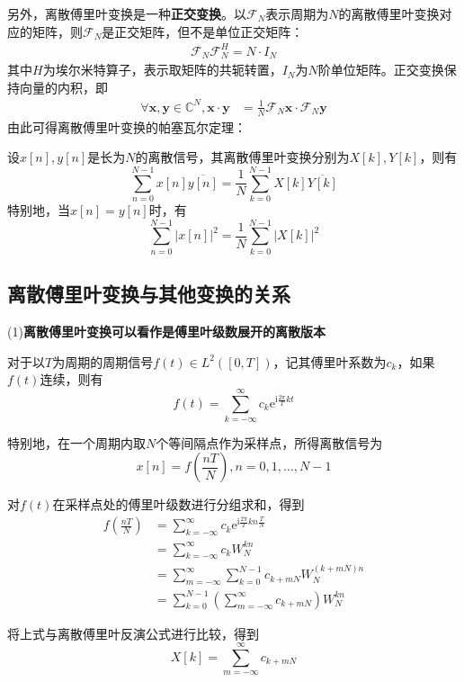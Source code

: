 \documentclass{ctexbook}
\begin{document}
另外，离散傅里叶变换是一种\textbf{正交变换}。以$\mathcal{F} _N$表示周期为$N$的离散傅里叶变换对应的矩阵，则$\mathcal{F} _N$是正交矩阵，但不是单位正交矩阵：
\begin{align*}
\mathcal{F}_N \mathcal{F}_N^H = N\cdot I_N
\end{align*}
其中$H$为埃尔米特算子，表示取矩阵的共轭转置，$I_N$为$N$阶单位矩阵。正交变换保持向量的内积，即
\begin{align*}
    \forall \mathbf{x,y}\in\mathbb{C}^N,\mathbf{x}\cdot\mathbf{y}&=\frac{1}{N}\mathcal{F} _N \mathbf{x}\cdot\mathcal{F} _N \mathbf{y}
\end{align*}
由此可得离散傅里叶变换的帕塞瓦尔定理：
\begin{theorem}[离散傅里叶变换的帕塞瓦尔定理]
    设$x[n],y[n]$是长为$N$的离散信号，其离散傅里叶变换分别为$X[k],Y[k]$，则有
    \[\sum_{n=0}^{N-1}x[n]\overline{y[n]}=\frac{1}{N}\sum_{k=0}^{N-1}X[k]\overline{Y[k]}\]
    特别地，当$x[n]=y[n]$时，有
    \[\sum_{n=0}^{N-1}|x[n]|^2=\frac{1}{N}\sum_{k=0}^{N-1}|X[k]|^2\]
\end{theorem}

\subsection{离散傅里叶变换与其他变换的关系}\label{sub:relation_of_dft}

(1)\textbf{离散傅里叶变换可以看作是傅里叶级数展开的离散版本}

对于以$T$为周期的周期信号$f(t)\in L^2([0,T])$，记其傅里叶系数为$c_k$，如果$f(t)$连续，则有
\[f(t)=\sum_{k=-\infty}^{\infty}c_k \mathrm{e}^{\mathrm{i}\frac{2\pi}{T}kt}\]

特别地，在一个周期内取$N$个等间隔点作为采样点，所得离散信号为
\[x[n]=f\left(\frac{nT}{N}\right),n=0,1,\dots,N-1\]

对$f(t)$在采样点处的傅里叶级数进行分组求和，得到
\begin{align*}
    f\left(\frac{nT}{N}\right)&=\sum_{k=-\infty}^{\infty}c_k \mathrm{e}^{\mathrm{i}\frac{2\pi}{T}kn\frac{T}{N}}\\
    &=\sum_{k=-\infty}^{\infty}c_k W_N^{kn}\\
    &=\sum_{m=-\infty}^{\infty}\sum_{k=0}^{N-1}c_{k+mN} W_N^{(k+mN)n}\\
    &=\sum_{k=0}^{N-1}\left(\sum_{m=-\infty}^{\infty}c_{k+mN}\right)W_N^{kn}
\end{align*}

将上式与离散傅里叶反演公式进行比较，得到
\[X[k]=\sum_{m=-\infty}^{\infty}c_{k+mN}\]
\end{document}

